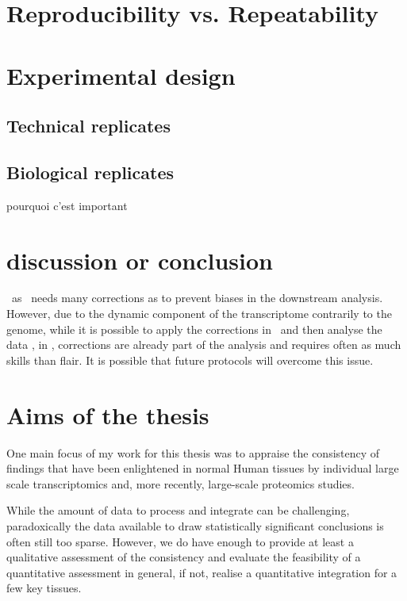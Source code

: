 \section{Reproducibility vs. Repeatability}


\section{Experimental design}
\subsection{Technical replicates}
\subsection{Biological replicates}
pourquoi c'est important




\section{discussion or conclusion}


\Rnaseq\ as \Dnaseq\ needs many corrections as to prevent biases in the downstream
analysis. However, due to the dynamic component of the transcriptome
contrarily to the genome, while it is possible to apply the corrections in
\Dnaseq\ and then analyse the data ,
in \Rnaseq, corrections are already part of
the analysis and requires often as much skills than flair. It is possible that
future protocols will overcome this issue.


\section{Aims of the thesis}

One main focus of my work for this thesis was to appraise the
consistency of findings that have been enlightened in normal Human tissues by
individual large scale transcriptomics and, more recently, large-scale
proteomics studies.

While the amount of data to process and integrate can be challenging,
paradoxically the data available to draw statistically significant conclusions
is often still too sparse. However, we do have enough to provide at least a
qualitative assessment of the consistency and evaluate the feasibility of a
quantitative assessment in general, if not, realise a quantitative integration
for a few key tissues.

